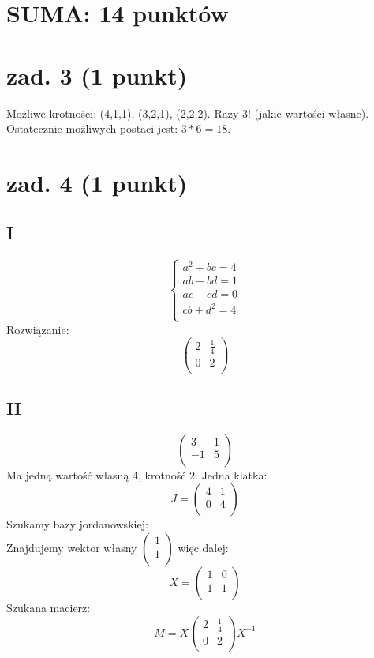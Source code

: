\documentclass{article}
\title{}
\date{03.06.2020}
\author{Maurycy Borkowski}
\begin{document}
\maketitle

\section{SUMA: 14 punktów}

\section{zad. 3 (1 punkt)}
Możliwe krotności: (4,1,1), (3,2,1), (2,2,2). Razy 3! (jakie wartości własne).\\
Ostatecznie możliwych postaci jest: $3*6 = 18$.
\section{zad. 4 (1 punkt)}
\subsection*{I}
$$
\begin{cases}
a^2 + bc = 4\\
ab + bd = 1\\
ac + cd = 0\\
cb + d^2 = 4\\
\end{cases}
$$
Rozwiązanie:
$$
\begin{pmatrix}
2 & \frac{1}{4}\\
0 & 2\\
\end{pmatrix}
$$
\subsection*{II}
$$
\begin{pmatrix}
3 & 1\\
-1 & 5\\
\end{pmatrix}
$$
Ma jedną wartość własną 4, krotność 2. Jedna klatka:
$$
J =
\begin{pmatrix}
4 & 1\\
0 & 4\\
\end{pmatrix}
$$
Szukamy bazy jordanowskiej:\\
Znajdujemy wektor własny 
$\begin{pmatrix}
1\\
1\\
\end{pmatrix}$ więc dalej:
$$
X =
\begin{pmatrix}
1 & 0\\
1 & 1\\
\end{pmatrix}
$$
Szukana macierz:
$$
M = X
\begin{pmatrix}
2 & \frac{1}{4}\\
0 & 2\\
\end{pmatrix}
X^{-1}
$$
\end{document}
